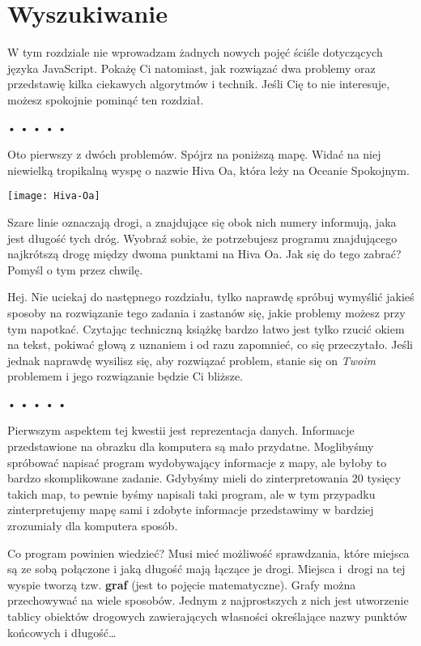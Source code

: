 \chapter{Wyszukiwanie}
\label{chap:7}

W tym rozdziale nie wprowadzam żadnych nowych pojęć ściśle dotyczących języka JavaScript. Pokażę Ci natomiast, jak rozwiązać dwa problemy oraz przedstawię kilka ciekawych algorytmów i technik. Jeśli Cię to nie interesuje, możesz spokojnie pominąć ten rozdział.

\begin{center}
• • • • •
\end{center}
  
Oto pierwszy z dwóch problemów. Spójrz na poniższą mapę. Widać na niej niewielką tropikalną wyspę o nazwie Hiva Oa, która leży na Oceanie Spokojnym.

\bigskip 
\centerline{\texttt{[image: Hiva-Oa]}} 
\smallskip
  
Szare linie oznaczają drogi, a znajdujące się obok nich numery informują, jaka jest długość tych dróg. Wyobraź sobie, że potrzebujesz programu znajdującego najkrótszą drogę między dwoma punktami na Hiva Oa. Jak się do tego zabrać? Pomyśl o tym przez chwilę.


Hej. Nie uciekaj do następnego rozdziału, tylko naprawdę spróbuj wymyślić jakieś sposoby na rozwiązanie tego zadania i zastanów się, jakie problemy możesz przy tym napotkać. Czytając techniczną książkę bardzo łatwo jest tylko rzucić okiem na tekst, pokiwać głową z uznaniem i od razu zapomnieć, co się przeczytało. Jeśli jednak naprawdę wysilisz się, aby rozwiązać problem, stanie się on \emph{Twoim} problemem i jego rozwiązanie będzie Ci bliższe.



\begin{center}
• • • • •
\end{center}

  
Pierwszym aspektem tej kwestii jest reprezentacja danych. Informacje przedstawione na obrazku dla komputera są mało przydatne. Moglibyśmy spróbować napisać program wydobywający informacje z mapy, ale byłoby to bardzo skomplikowane zadanie. Gdybyśmy mieli do zinterpretowania 20 tysięcy takich map, to pewnie byśmy napisali taki program, ale w tym przypadku zinterpretujemy mapę sami i zdobyte informacje przedstawimy w bardziej zrozumiały dla komputera sposób.

  
Co program powinien wiedzieć? Musi mieć możliwość sprawdzania, które miejsca są ze sobą połączone i jaką długość mają łączące je drogi. Miejsca i~drogi na tej wyspie tworzą tzw. \textbf{graf} (jest to pojęcie matematyczne). Grafy można przechowywać na wiele sposobów. Jednym z najprostszych z nich jest utworzenie tablicy obiektów drogowych zawierających własności określające nazwy punktów końcowych i długość…


